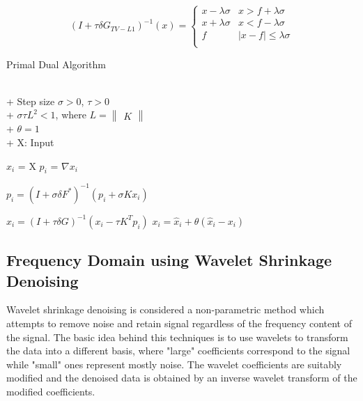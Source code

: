 \begin{equation}
    \label{eq:tvl1_denoise_general_g_tvl1_tilde}
    \left(I + \tau \delta G_{TV-L1}\right)^{-1}\left(x\right) = \left\{\begin{matrix}
    x - \lambda \sigma & x > f +  \lambda \sigma\\
    x + \lambda \sigma & x < f -  \lambda \sigma\\
    f & \left|x - f\right|\leq \lambda \sigma\\
    \end{matrix}\right.
\end{equation}

\begin{algorithm}[ht]
	\caption {Primal Dual Algorithm}
	\label{alg:primal_dual_general}
	\SetVline
	\AlgoDisplayBlockMarkers{}%
	\KwData
	{	
		\\
		+ Step size $\sigma > 0$, $\tau > 0$ \\
		+ $\sigma \tau L^{2} < 1$, where $L = \begin{Vmatrix}K\end{Vmatrix}$ \\
		+ $\theta = 1$\\
		+ X: Input
	}
	\Begin
	{
		$x_{i}$ = X\;
		$p_{i}$ = $\nabla x_{i}$\;
		{
			$p_{i} = \left(I + \sigma \delta F^{*}\right)^{-1}\left(p_{i} + \sigma K x_{i}\right)$
			\BlankLine
			
			$\hat{x}_{i} = \left(I + \tau \delta G\right)^{-1}\left(x_{i} - \tau K^{T} p_{i}\right)$\;
			\BlankLine
			$x_{i} = \hat{x}_{i} + \theta \left(\hat{x}_{i} - x_{i}\right) $\;
		}
	}	
\end{algorithm}

\subsection{Frequency Domain using Wavelet Shrinkage Denoising}
Wavelet shrinkage denoising \cite{fodor2003denoising} is considered a non-parametric method which attempts to remove noise and retain signal regardless of the frequency content of the signal. The basic idea behind this techniques is to use wavelets to transform the data into a different basis, where "large" coefficients correspond to the signal while "small" ones represent mostly noise. The wavelet coefficients are suitably modified and the denoised data is obtained by an inverse wavelet transform of the modified coefficients.

